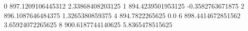 0 897.1209106445312 2.33868408203125
1 894.4239501953125 -0.3582763671875
2 896.1087646484375 1.3265380859375
4 894.7822265625 0.0
6 898.4414672851562 3.65924072265625
8 900.6187744140625 5.8365478515625
